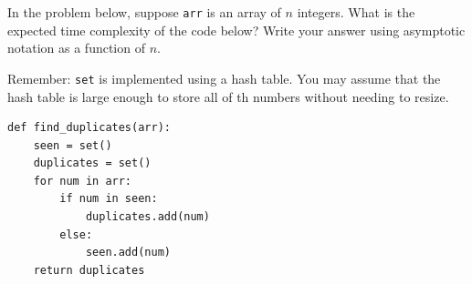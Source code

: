 \begin{prob}

In the problem below, suppose \texttt{arr} is an array of $n$ integers. What is
the expected time complexity of the code below? Write your answer using
asymptotic notation as a function of $n$.

Remember: \texttt{set} is implemented using a hash table. You may assume that the hash
table is large enough to store all of th numbers without needing to resize.

\begin{verbatim}
def find_duplicates(arr):
    seen = set()
    duplicates = set()
    for num in arr:
        if num in seen:
            duplicates.add(num)
        else:
            seen.add(num)
    return duplicates
\end{verbatim}


\end{prob}
